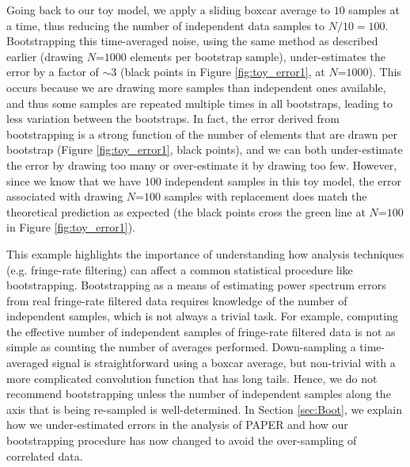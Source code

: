 \documentclass[preprint2,numberedappendix,tighten]{aastex6}  %
\begin{document}
Going back to our toy model, we apply a sliding boxcar average to $10$ samples at a time, thus reducing the number of 
independent data samples to $N/10 = 100$. Bootstrapping this time-averaged noise, using the same method as described 
earlier (drawing $N$=$1000$ elements per bootstrap sample), under-estimates the error by a factor of $\sim3$ (black points in Figure \ref{fig:toy_error1}, at $N$=$1000$). This occurs 
because we are drawing more samples than independent ones available, and thus some samples are repeated multiple times 
in all bootstraps, leading to less variation between the bootstraps. In fact, the error derived from bootstrapping is a strong 
function of the number of elements that are drawn per bootstrap (Figure \ref{fig:toy_error1}, black points), and we can both 
under-estimate the error by drawing too many or over-estimate it by drawing too few. However, since we know that we have $100$ 
independent samples in this toy model, the error associated with drawing $N$=$100$ samples with replacement does match the theoretical prediction 
as expected (the black points cross the green line at $N$=$100$ in Figure \ref{fig:toy_error1}).

This example highlights the importance of understanding how analysis techniques (e.g. fringe-rate filtering) can affect a 
common statistical procedure like bootstrapping. Bootstrapping as a means of estimating power spectrum errors from real 
fringe-rate filtered data requires knowledge of the number of independent samples, which is not always a trivial task. For 
example, computing the effective number of independent samples of fringe-rate filtered data is not as simple as counting the 
number of averages performed. Down-sampling a time-averaged signal is straightforward using a boxcar average, but non-trivial with a more complicated convolution function that has long tails. Hence, we do not recommend bootstrapping unless the 
number of independent samples along the axis that is being re-sampled is well-determined. In Section \ref{sec:Boot}, we explain how we under-estimated errors in the  analysis of PAPER and how our bootstrapping procedure has now changed to avoid the over-sampling of correlated data. 
\end{document}
